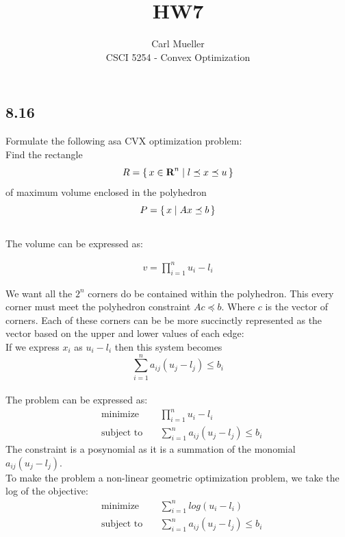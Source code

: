 \documentclass[12pt]{article}
\newenvironment{proposition}[2][Proposition]{\begin{trivlist}
\item[\hskip \labelsep {\bfseries #1}\hskip \labelsep {\bfseries #2.}]}{\end{trivlist}}
\begin{document}
 
 
 
\title{HW7}
\author{Carl Mueller\\ %
CSCI 5254 - Convex Optimization} %
\maketitle

\subsection*{8.16}
Formulate the following asa CVX optimization problem:\\
Find the rectangle
$$R = \set{x \in \textbf{R}^n | l \preceq x \preceq u}$$
of maximum volume enclosed in the polyhedron
$$P = \set{x | Ax \preceq b}$$\\
The volume can be expressed as:
\begin{proposition}{1}
\begin{align}
v = \prod_{i=1}^{n}u_i-l_i
\end{align}
\end{proposition}
We want all the $2^n$ corners do be contained within the polyhedron. This every corner must meet the polyhedron constraint $Ac \preceq b$. Where $c$ is the vector of corners. Each of these corners can be be more succinctly represented as the vector based on the upper and lower values of each edge:\\ 
If we express $x_i$ as $u_i-l_i$ then this system becomes
$$\sum_{i=1}^{n}a_{ij}(u_j-l_j) \le b_i$$\\
The problem can be expressed as:
\begin{equation*}
\begin{aligned}
& \underset{}{\text{minimize}}
& & \prod_{i=1}^{n}u_i-l_i\\
& \text{subject to}\
& &\sum_{i=1}^{n}a_{ij}(u_j-l_j) \le b_i
\end{aligned}
\end{equation*}
The constraint is a posynomial as it is a summation of the monomial $a_{ij}(u_j-l_j)$.\\
To make the problem a non-linear geometric optimization problem, we take the log of the objective:
\begin{equation*}
\begin{aligned}
& \underset{}{\text{minimize}}
& & \sum_{i=1}^{n}log(u_i-l_i)\\
& \text{subject to}\
& &\sum_{i=1}^{n}a_{ij}(u_j-l_j) \le b_i
\end{aligned}
\end{equation*}
\end{document}
